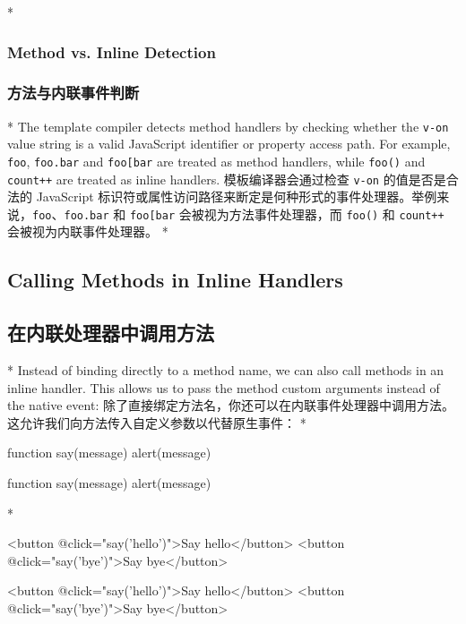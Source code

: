 \begin{paracol}{2}

\switchcolumn[0]*%
\subsubsection{Method vs. Inline Detection}
\switchcolumn
\subsubsection{方法与内联事件判断}
\switchcolumn[0]*%
The template compiler detects method handlers by checking whether the
\texttt{v-on} value string is a valid JavaScript identifier or property
access path. For example, \texttt{foo}, \texttt{foo.bar} and
\texttt{foo{[}\textquotesingle{}bar\textquotesingle{}{]}} are treated as
method handlers, while \texttt{foo()} and \texttt{count++} are treated
as inline handlers.
\switchcolumn
模板编译器会通过检查 \texttt{v-on} 的值是否是合法的 JavaScript
标识符或属性访问路径来断定是何种形式的事件处理器。举例来说，\texttt{foo}、\texttt{foo.bar}
和 \texttt{foo{[}\textquotesingle{}bar\textquotesingle{}{]}}
会被视为方法事件处理器，而 \texttt{foo()} 和 \texttt{count++}
会被视为内联事件处理器。
\switchcolumn[0]*%
\subsection{Calling Methods in Inline Handlers}
\switchcolumn
\subsection{在内联处理器中调用方法}
\switchcolumn[0]*%
Instead of binding directly to a method name, we can also call methods
in an inline handler. This allows us to pass the method custom arguments
instead of the native event:
\switchcolumn
除了直接绑定方法名，你还可以在内联事件处理器中调用方法。这允许我们向方法传入自定义参数以代替原生事件：
\switchcolumn[0]*%
\begin{codeJs}
function say(message) {
    alert(message)
}
\end{codeJs}
\switchcolumn
\begin{codeJs}
function say(message) {
    alert(message)
}
\end{codeJs}
\switchcolumn[0]*%
\begin{codeHtml}
<button @click="say('hello')">Say hello</button>
<button @click="say('bye')">Say bye</button>
\end{codeHtml}
\switchcolumn
\begin{codeHtml}
<button @click="say('hello')">Say hello</button>
<button @click="say('bye')">Say bye</button>
\end{codeHtml}


\end{paracol}
